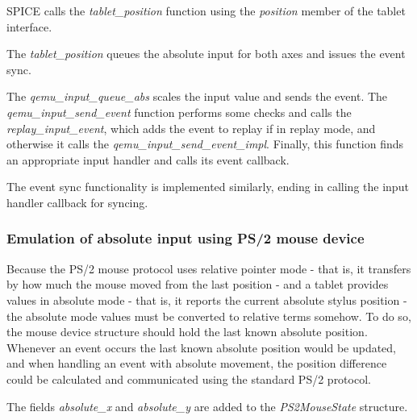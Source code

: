 SPICE calls the \emph{tablet\_position} function using the \emph{position}
member of the tablet interface.

\begin{codeblock}
    
\end{codeblock}

\noindent
The \emph{tablet\_position} queues the absolute input for both axes and issues
the event sync.

The \emph{qemu\_input\_queue\_abs} scales the input value and sends the event.
The \emph{qemu\_input\_send\_event} function performs some checks and calls the
\emph{replay\_input\_event}, which adds the event to replay if in replay mode,
and otherwise it calls the \emph{qemu\_input\_send\_event\_impl}.  Finally, this
function finds an appropriate input handler and calls its event callback.

\begin{codeblock}
    
    
    
\end{codeblock}

\noindent
The event sync functionality is implemented similarly, ending in calling the
input handler callback for syncing.

\subsubsection{Emulation of absolute input using PS/2 mouse device}

Because the PS/2 mouse protocol uses relative pointer mode - that is, it
transfers by how much the mouse moved from the last position - and a tablet
provides values in absolute mode - that is, it reports the current absolute
stylus position - the absolute mode values must be converted to relative terms
somehow.  To do so, the mouse device structure should hold the last known
absolute position.  Whenever an event occurs the last known absolute position
would be updated, and when handling an event with absolute movement, the position
difference could be calculated and communicated using the standard PS/2
protocol.

The fields \emph{absolute\_x} and \emph{absolute\_y} are added to the
\emph{PS2MouseState} structure.


